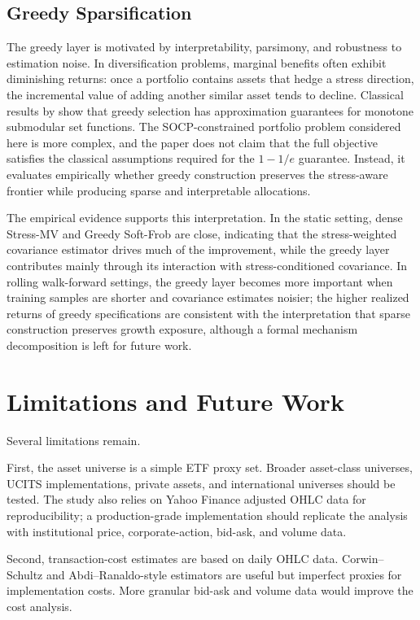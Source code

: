 \documentclass[11pt]{article}
\begin{document}
\subsection{Greedy Sparsification}

The greedy layer is motivated by interpretability, parsimony, and robustness to estimation noise. In diversification problems, marginal benefits often exhibit diminishing returns: once a portfolio contains assets that hedge a stress direction, the incremental value of adding another similar asset tends to decline. Classical results by \citet{nemhauser1978} show that greedy selection has approximation guarantees for monotone submodular set functions. The SOCP-constrained portfolio problem considered here is more complex, and the paper does not claim that the full objective satisfies the classical assumptions required for the $1-1/e$ guarantee. Instead, it evaluates empirically whether greedy construction preserves the stress-aware frontier while producing sparse and interpretable allocations.

The empirical evidence supports this interpretation. In the static setting, dense Stress-MV and Greedy Soft-Frob are close, indicating that the stress-weighted covariance estimator drives much of the improvement, while the greedy layer contributes mainly through its interaction with stress-conditioned covariance. In rolling walk-forward settings, the greedy layer becomes more important when training samples are shorter and covariance estimates noisier; the higher realized returns of greedy specifications are consistent with the interpretation that sparse construction preserves growth exposure, although a formal mechanism decomposition is left for future work.

\section{Limitations and Future Work}
\label{sec:limitations}

Several limitations remain.

First, the asset universe is a simple ETF proxy set. Broader asset-class universes, UCITS implementations, private assets, and international universes should be tested. The study also relies on Yahoo Finance adjusted OHLC data for reproducibility; a production-grade implementation should replicate the analysis with institutional price, corporate-action, bid-ask, and volume data.

Second, transaction-cost estimates are based on daily OHLC data. Corwin--Schultz and Abdi--Ranaldo-style estimators \citep{corwinschultz2012,abdiranaldo2017} are useful but imperfect proxies for implementation costs. More granular bid-ask and volume data would improve the cost analysis.
\end{document}
